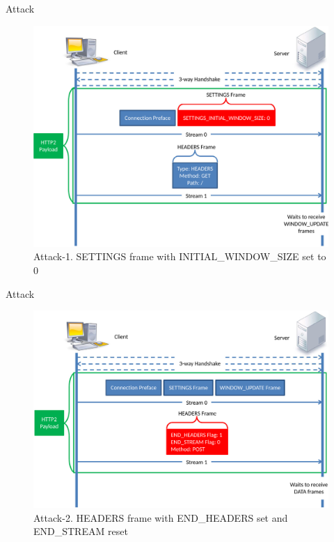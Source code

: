 \documentclass{beamer}
\begin{document}
\begin{frame}{Attack }
  \begin{figure}[t]
    \includegraphics[scale=0.22]{images/attack1.png}
    \caption{Attack-1. SETTINGS frame with INITIAL\_WINDOW\_SIZE set to 0}
  \end{figure}
\end{frame}

\begin{frame}{Attack }
  \begin{figure}[t]
    \includegraphics[scale=0.24]{images/attack2.png}
    \caption{Attack-2. HEADERS frame with END\_HEADERS set and END\_STREAM reset}
  \end{figure}
\end{frame}
\end{document}

